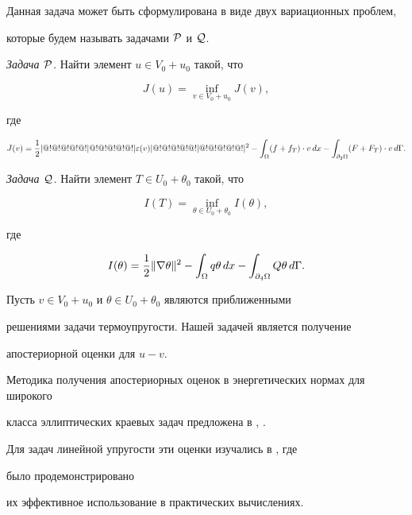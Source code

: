 Данная задача может быть сформулирована в виде двух вариационных проблем,


которые будем называть задачами $\cal P$ и $\cal Q$.


\medskip





{\it Задача $\cal P$.} Найти элемент $u \in V_0+u_0$ такой, что


$$


J(u)= \inf_{v\in V_0+u_0} J(v),


$$


где


$$


J(v)=\frac{1}{2} \norme{\varepsilon(v)}^2-\int_{\Omega} (f+f_T)\cdot v \,dx


-\int_{\partial_2\Omega} (F+F_T) \cdot v \, d\Gamma.


$$





{\it Задача $\cal Q$.} Найти элемент $T \in U_0+\theta_0$ такой, что


$$


I(T)= \inf_{\theta\in U_0+\theta_0} I(\theta),


$$


где


$$


I(\theta)=\frac{1}{2} \norm{\nabla\theta}^2-\int_{\Omega} q \theta \,dx


-\int_{\partial_4\Omega} Q  \theta \, d\Gamma.


$$


Пусть $v\in V_0+u_0$ и $\theta \in U_0+\theta_0$ являются приближенными 


решениями задачи термоупругости. Нашей задачей является получение 


апостериорной оценки для $u-v$.





Методика получения апостериорных оценок в энергетических нормах для широкого


класса эллиптических краевых задач предложена в \cite{Re3}, \cite{Re4}. 


Для задач линейной упругости эти оценки изучались в \cite{MuRe}, где 


было продемонстрировано


их эффективное использование в практических вычислениях.





